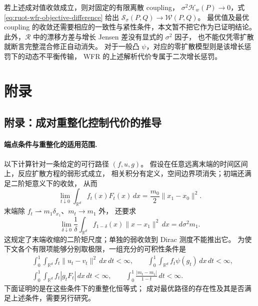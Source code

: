 \documentclass[UTF8,a4paper,11pt,fontset=fandol]{ctexart}
\begin{document}
若上述成对值收敛成立，则对固定的有限离散 coupling，
$\sigma^2\mathcal H_w(P)\to0$，式 \eqref{eq:ruot-wfr-objective-difference}
给出 $\mathcal S_\sigma(P,Q)\to\mathcal W(P,Q)$。
最优值及最优 coupling 的收敛还需要相应的一致性与紧性条件，本文暂不把它作为已证明结论。
此外，$\mathcal R$ 中的漂移方差与增长 Jensen 差没有显式的 $\sigma^2$ 因子，
也不能仅凭零扩散就断言完整混合修正自动消失。
对于一般凸 $\psi$，对应的零扩散模型则是该增长惩罚下的动态不平衡传输，
WFR 的上述解析代价专属于二次增长惩罚。

\clearpage
\appendix
\section*{附录}
\setcounter{equation}{0}
\renewcommand{\theequation}{A.\arabic{equation}}
\renewcommand{\theHequation}{A.\arabic{equation}}

\subsection*{附录：成对重整化控制代价的推导}

\paragraph{端点条件与重整化的适用范围.}
以下计算针对一条给定的可行路径 $(f,u,g)$。
假设在任意远离末端的时间区间上，反应扩散方程的弱形式成立，
相关积分有定义，空间边界项消失；初端还满足二阶矩意义下的收敛，
从而
\begin{equation}
\lim_{t\downarrow0}\int_{\mathbb R^d}f_t(x)F_t(x)\,dx
=\frac{m_0}{2}\|x_1-x_0\|^2.
\label{eq:initial-boundary}
\end{equation}
末端除 $f_t\rightharpoonup m_1\delta_{x_1}$、$m_t\to m_1$ 外，
还要求
\begin{equation}
\lim_{\delta\downarrow0}
\frac1\delta\int_{\mathbb R^d}
f_{1-\delta}(x)\|x-x_1\|^2\,dx
=d\sigma^2m_1.
\label{eq:terminal-second-moment}
\end{equation}
这规定了末端收缩的二阶矩尺度；单独的弱收敛到 Dirac 测度不能推出它。
为使下文各个有限项能够分别取极限，一组充分的可积性条件是
\begin{equation}
\begin{aligned}
&\int_0^1\int_{\mathbb R^d}f_t\|u_t-v_t\|^2\,dx\,dt<\infty,
\qquad
\int_0^1\int_{\mathbb R^d}f_t\psi(g_t)\,dx\,dt<\infty,\\
&\int_0^1\int_{\mathbb R^d}f_t|g_tF_t|\,dx\,dt<\infty,
\qquad
\int_0^1\frac{|m_t-m_1|}{1-t}\,dt<\infty.
\end{aligned}
\label{eq:integrability}
\end{equation}
下面证明的是在这些条件下的重整化恒等式；
成对最优路径的存在性及其是否满足上述条件，需要另行研究。
\end{document}
